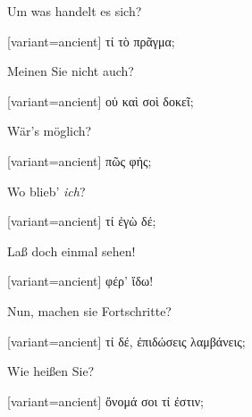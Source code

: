 Um was handelt es sich?

\switchcolumn

\begin{greek}[variant=ancient]%
τί τὸ πρᾶγμα;

\end{greek}%
\switchcolumn*

Meinen Sie nicht auch?

\switchcolumn

\begin{greek}[variant=ancient]%
οὐ καὶ σοὶ δοκεῖ;

\end{greek}%
\switchcolumn*

Wär's möglich?

\switchcolumn

\begin{greek}[variant=ancient]%
πῶς φής;

\end{greek}%
\switchcolumn*

Wo blieb' \emph{ich}?

\switchcolumn

\begin{greek}[variant=ancient]%
τί ἐγὼ δέ;

\end{greek}%
\switchcolumn*

Laß doch einmal sehen!

\switchcolumn

\begin{greek}[variant=ancient]%
φέρ' ἴδω!

\end{greek}%
\switchcolumn*

Nun, machen sie Fort\textcompwordmark{}schritte?

\switchcolumn

\begin{greek}[variant=ancient]%
τί δέ, ἐπιδώσεις λαμβάνεις;

\end{greek}%
\indent Wie heißen Sie?

\switchcolumn

\begin{greek}[variant=ancient]%
ὄνομά σοι τί ἐστιν;

\end{greek}%
\switchcolumn*

